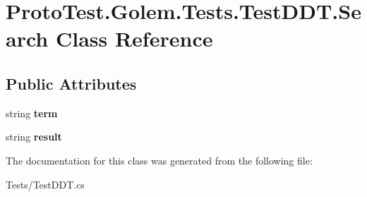 \hypertarget{class_proto_test_1_1_golem_1_1_tests_1_1_test_d_d_t_1_1_search}{\section{Proto\-Test.\-Golem.\-Tests.\-Test\-D\-D\-T.\-Search Class Reference}
\label{class_proto_test_1_1_golem_1_1_tests_1_1_test_d_d_t_1_1_search}
}
\subsection*{Public Attributes}
\begin{DoxyCompactItemize}
\item 
\hypertarget{class_proto_test_1_1_golem_1_1_tests_1_1_test_d_d_t_1_1_search_ac058c7b154c0b6873fda901373da19bd}{string {\bfseries term}}\label{class_proto_test_1_1_golem_1_1_tests_1_1_test_d_d_t_1_1_search_ac058c7b154c0b6873fda901373da19bd}

\item 
\hypertarget{class_proto_test_1_1_golem_1_1_tests_1_1_test_d_d_t_1_1_search_a57726a3e40ae3c064dbf7fdf2f0ba114}{string {\bfseries result}}\label{class_proto_test_1_1_golem_1_1_tests_1_1_test_d_d_t_1_1_search_a57726a3e40ae3c064dbf7fdf2f0ba114}

\end{DoxyCompactItemize}


The documentation for this class was generated from the following file\-:\begin{DoxyCompactItemize}
\item 
Tests/Test\-D\-D\-T.\-cs\end{DoxyCompactItemize}
